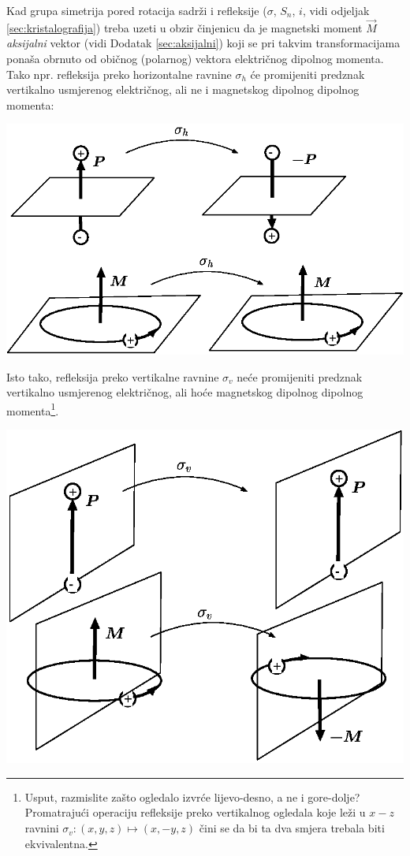 Kad grupa simetrija pored rotacija sadrži i refleksije ($\sigma$, $S_n$, $i$,
vidi odjeljak \ref{sec:kristalografija}) treba
uzeti u obzir činjenicu da je magnetski moment $\vec{M}$ \emph{aksijalni}
vektor (vidi Dodatak \ref{sec:aksijalni})
koji se pri takvim transformacijama ponaša obrnuto od običnog
(polarnog) vektora električnog dipolnog momenta.
Tako npr. refleksija preko horizontalne ravnine $\sigma_h$ će promijeniti
predznak vertikalno usmjerenog električnog, ali ne i
magnetskog dipolnog dipolnog momenta:

\centerline{\includegraphics[scale=0.8]{pics/aksijal1.eps}}

Isto tako, refleksija preko vertikalne ravnine $\sigma_v$ neće promijeniti
predznak vertikalno usmjerenog električnog, ali hoće
magnetskog dipolnog dipolnog momenta\footnote{ 
Usput, razmislite zašto ogledalo izvrće lijevo-desno, a ne i gore-dolje? Promatrajući
operaciju refleksije preko vertikalnog ogledala koje leži
u $x-z$ ravnini $\sigma_v:(x, y, z)\mapsto (x, -y, z)$
čini se da bi ta dva smjera trebala biti ekvivalentna.}.

\centerline{\includegraphics[scale=0.8]{pics/aksijal2.eps}}


